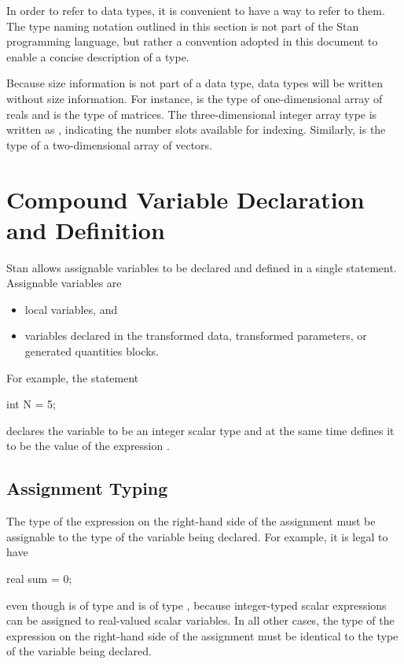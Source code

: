 In order to refer to data types, it is convenient to have a way to
refer to them.  The type naming notation outlined in this section is
not part of the Stan programming language, but rather a convention
adopted in this document to enable a concise description of a type.

Because size information is not part of a data type, data
types will be written without size information.  For instance,
 is the type of one-dimensional array of reals and
 is the type of matrices.  The three-dimensional integer
array type is written as , indicating the number slots
available for indexing.  Similarly,  is the type of a
two-dimensional array of vectors.


\section{Compound Variable Declaration and Definition}

Stan allows assignable variables to be declared and defined in a
single statement.  Assignable variables are 
%
\begin{itemize}
\item local variables, and
\item variables declared in the transformed data,
transformed parameters, or generated quantities blocks.
\end{itemize}
%
For example, the statement
%
\begin{stancode}
int N = 5;
\end{stancode}
%
declares the variable  to be an integer scalar type and at the
same time defines it to be the value of the expression .  

\subsection{Assignment Typing}

The type of the expression on the right-hand side of the assignment
must be assignable to the type of the variable being declared.  For
example, it is legal to have
%
\begin{stancode}
real sum = 0;
\end{stancode}
%
even though  is of type  and  is of type
, because integer-typed scalar expressions can be assigned
to real-valued scalar variables.  In all other cases, the type of the
expression on the right-hand side of the assignment must be identical
to the type of the variable being declared.

